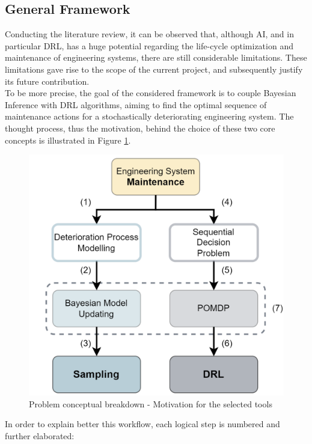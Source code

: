 

\subsection{General Framework}

Conducting the literature review, it can be observed that, although \gls{AI}, and in particular \gls{DRL}, has a huge potential regarding the life-cycle optimization and maintenance of engineering systems, there are still considerable limitations. These limitations gave rise to the scope of the current project, and subsequently justify its future contribution.\\

To be more precise, the goal of the considered framework is to couple Bayesian Inference with \gls{DRL} algorithms, aiming to find the optimal sequence of maintenance actions for a stochastically deteriorating engineering system. The thought process, thus the motivation, behind the choice of these two core concepts is illustrated in Figure \ref{conceptFlowV1}.

\begin{figure}[H]
    \centering
	\includegraphics[width=0.6\linewidth]{Figures/conceptFlow.png}
	\caption{Problem conceptual breakdown - Motivation for the selected tools}
	\label{conceptFlowV1}
\end{figure}

In order to explain better this workflow, each logical step is numbered and further elaborated:



